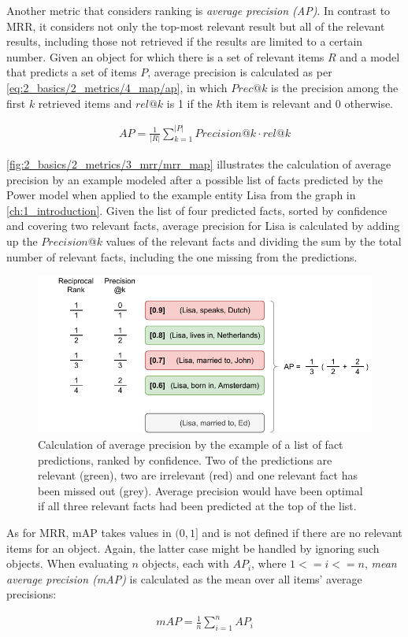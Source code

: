 Another metric that considers ranking is \emph{average precision (AP)}. In contrast to MRR, it considers not only the top-most relevant result but all of the relevant results, including those not retrieved if the results are limited to a certain number. Given an object for which there is a set of relevant items $R$ and a model that predicts a set of items $P$, average precision is calculated as per \autoref{eq:2_basics/2_metrics/4_map/ap}, in which $Prec@k$ is the precision among the first $k$ retrieved items and $rel@k$ is 1 if the $k$th item is relevant and 0 otherwise.

\begin{align}
    AP = \frac{1}{|R|} \sum_{k=1}^{|P|} Precision@k \cdot rel@k
    \label{eq:2_basics/2_metrics/4_map/ap}
\end{align}

\autoref{fig:2_basics/2_metrics/3_mrr/mrr_map} illustrates the calculation of average precision by an example modeled after a possible list of facts predicted by the Power model when applied to the example entity Lisa from the graph in \autoref{ch:1_introduction}. Given the list of four predicted facts, sorted by confidence and covering two relevant facts, average precision for Lisa is calculated by adding up the $Precision@k$ values of the relevant facts and dividing the sum by the total number of relevant facts, including the one missing from the predictions.

\begin{figure}[t]
    \centering
    \includegraphics{2_basics/2_metrics/4_map/mrr_map}
    \caption{Calculation of average precision by the example of a list of fact predictions, ranked by confidence. Two of the predictions are relevant (green), two are irrelevant (red) and one relevant fact has been missed out (grey). Average precision would have been optimal if all three relevant facts had been predicted at the top of the list.}
    \label{fig:2_basics/2_metrics/4_map/mrr_map}
\end{figure}

As for MRR, mAP takes values in $(0, 1]$ and is not defined if there are no relevant items for an object. Again, the latter case might be handled by ignoring such objects. When evaluating $n$ objects, each with $AP_i$, where $1 <= i <= n$, \emph{mean average precision (mAP)} is calculated as the mean over all items' average precisions:

\begin{align}
    mAP = \frac{1}{n} \sum_{i=1}^{n} AP_i
    \label{eq:2_basics/2_metrics/4_map/map}
\end{align}



